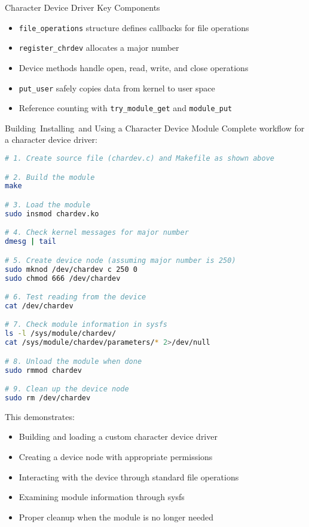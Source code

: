 \begin{KR}{Character Device Driver Key Components}
    \begin{itemize}
        \item \texttt{file\_operations} structure defines callbacks for file operations
        \item \texttt{register\_chrdev} allocates a major number
        \item Device methods handle open, read, write, and close operations
        \item \texttt{put\_user} safely copies data from kernel to user space
        \item Reference counting with \texttt{try\_module\_get} and \texttt{module\_put}
    \end{itemize}
\end{KR}


\begin{example2}{Building\, Installing\, and Using a Character Device Module}
    Complete workflow for a character device driver:
    
\begin{lstlisting}[language=bash, style=basesmol]
# 1. Create source file (chardev.c) and Makefile as shown above

# 2. Build the module
make

# 3. Load the module
sudo insmod chardev.ko

# 4. Check kernel messages for major number
dmesg | tail

# 5. Create device node (assuming major number is 250)
sudo mknod /dev/chardev c 250 0
sudo chmod 666 /dev/chardev

# 6. Test reading from the device
cat /dev/chardev

# 7. Check module information in sysfs
ls -l /sys/module/chardev/
cat /sys/module/chardev/parameters/* 2>/dev/null

# 8. Unload the module when done
sudo rmmod chardev

# 9. Clean up the device node
sudo rm /dev/chardev
\end{lstlisting}

    This demonstrates:
    \begin{itemize}
        \item Building and loading a custom character device driver
        \item Creating a device node with appropriate permissions
        \item Interacting with the device through standard file operations
        \item Examining module information through sysfs
        \item Proper cleanup when the module is no longer needed
    \end{itemize}
\end{example2}

